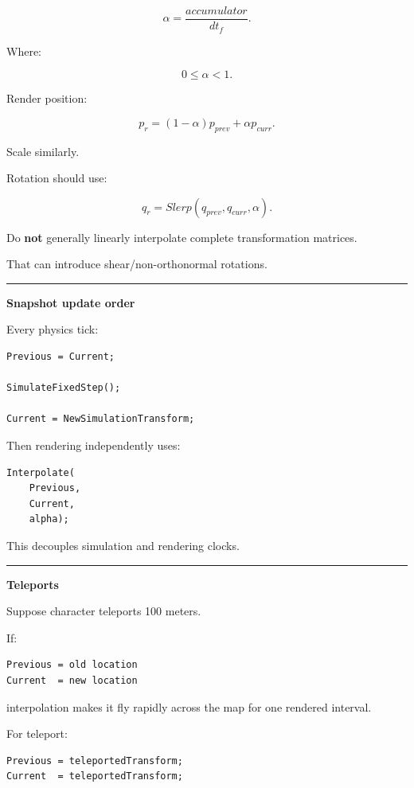\[
\alpha=
\frac{accumulator}{dt_f}.
\]

Where:

\[
0\le\alpha<1.
\]

Render position:

\[
p_r=
(1-\alpha)p_{prev}
+
\alpha p_{curr}.
\]

Scale similarly.

Rotation should use:

\[
q_r=
Slerp(q_{prev},q_{curr},\alpha).
\]

Do \textbf{not} generally linearly interpolate complete transformation matrices.

That can introduce shear/non-orthonormal rotations.

\begin{center}\rule{0.5\linewidth}{0.5pt}\end{center}

\textbf{Snapshot update order}

Every physics tick:

\begin{verbatim}
Previous = Current;

SimulateFixedStep();

Current = NewSimulationTransform;
\end{verbatim}

Then rendering independently uses:

\begin{verbatim}
Interpolate(
    Previous,
    Current,
    alpha);
\end{verbatim}

This decouples simulation and rendering clocks.

\begin{center}\rule{0.5\linewidth}{0.5pt}\end{center}

\textbf{Teleports}

Suppose character teleports 100 meters.

If:

\begin{verbatim}
Previous = old location
Current  = new location
\end{verbatim}

interpolation makes it fly rapidly across the map for one rendered interval.

For teleport:

\begin{verbatim}
Previous = teleportedTransform;
Current  = teleportedTransform;
\end{verbatim}

